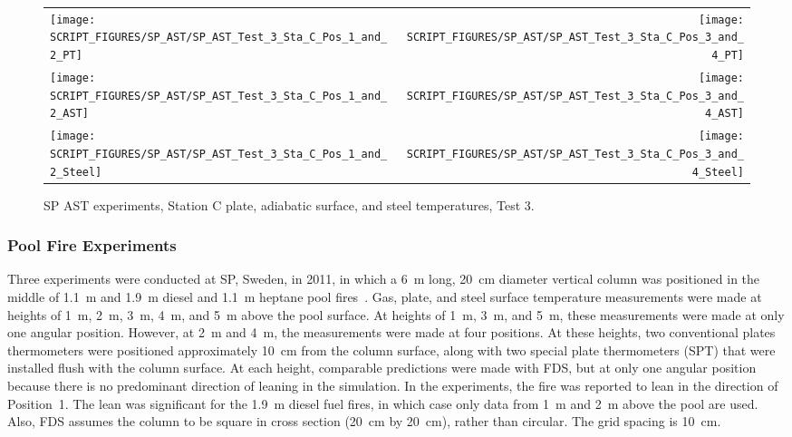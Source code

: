 \begin{figure}[p]
\begin{tabular*}{\textwidth}{l@{\extracolsep{\fill}}r}
\texttt{[image: SCRIPT\_FIGURES/SP\_AST/SP\_AST\_Test\_3\_Sta\_C\_Pos\_1\_and\_2\_PT]} &
\texttt{[image: SCRIPT\_FIGURES/SP\_AST/SP\_AST\_Test\_3\_Sta\_C\_Pos\_3\_and\_4\_PT]} \\
\texttt{[image: SCRIPT\_FIGURES/SP\_AST/SP\_AST\_Test\_3\_Sta\_C\_Pos\_1\_and\_2\_AST]} &
\texttt{[image: SCRIPT\_FIGURES/SP\_AST/SP\_AST\_Test\_3\_Sta\_C\_Pos\_3\_and\_4\_AST]} \\
\texttt{[image: SCRIPT\_FIGURES/SP\_AST/SP\_AST\_Test\_3\_Sta\_C\_Pos\_1\_and\_2\_Steel]} &
\texttt{[image: SCRIPT\_FIGURES/SP\_AST/SP\_AST\_Test\_3\_Sta\_C\_Pos\_3\_and\_4\_Steel]}
\end{tabular*}
\caption{SP AST experiments, Station C plate, adiabatic surface, and steel temperatures, Test 3.}
\label{SP_Test_3_Station_C}
\end{figure}

\clearpage

\subsubsection{Pool Fire Experiments}

Three experiments were conducted at SP, Sweden, in 2011, in which a 6~m long, 20~cm diameter vertical column was positioned in the middle of 1.1~m and 1.9~m diesel and 1.1~m heptane pool fires~\cite{Sjostrom:AST}. Gas, plate, and steel surface temperature measurements were made at heights of 1~m, 2~m, 3~m, 4~m, and 5~m above the pool surface. At heights of 1~m, 3~m, and 5~m, these measurements were made at only one angular position. However, at 2~m and 4~m, the measurements were made at four positions. At these heights, two conventional plates thermometers were positioned approximately 10~cm from the column surface, along with two special plate thermometers (SPT) that were installed flush with the column surface. At each height, comparable predictions were made with FDS, but at only one angular position because there is no predominant direction of leaning in the simulation. In the experiments, the fire was reported to lean in the direction of Position~1. The lean was significant for the 1.9~m diesel fuel fires, in which case only data from 1~m and 2~m above the pool are used. Also, FDS assumes the column to be square in cross section (20~cm by 20~cm), rather than circular. The grid spacing is 10~cm.

